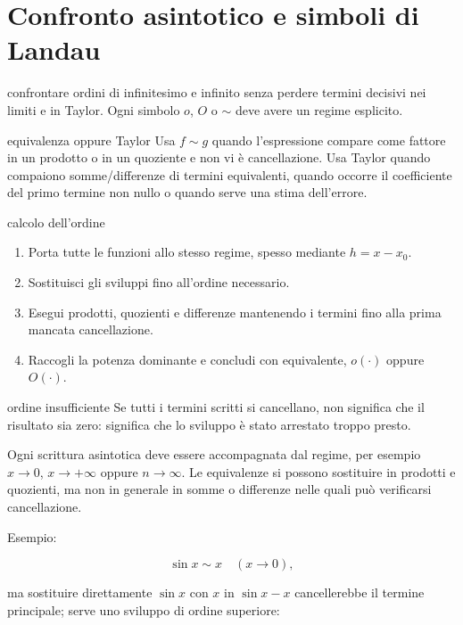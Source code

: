 \chapter{Confronto asintotico e simboli di Landau}
\label{chap:9}

\begin{obiettivocapitolo}{confrontare ordini di infinitesimo e infinito senza perdere termini decisivi}
\prioritaalta nei limiti e in Taylor. Ogni simbolo $o$, $O$ o $\sim$ deve avere un regime esplicito.
\end{obiettivocapitolo}
\begin{sceltametodo}{equivalenza oppure Taylor}
Usa $f\sim g$ quando l'espressione compare come fattore in un prodotto o in un quoziente e non vi è cancellazione. Usa Taylor quando compaiono somme/differenze di termini equivalenti, quando occorre il coefficiente del primo termine non nullo o quando serve una stima dell'errore.
\end{sceltametodo}
\begin{proceduraesame}{calcolo dell'ordine}
\begin{enumerate}
\item Porta tutte le funzioni allo stesso regime, spesso mediante $h=x-x_0$.
\item Sostituisci gli sviluppi fino all'ordine necessario.
\item Esegui prodotti, quozienti e differenze mantenendo i termini fino alla prima mancata cancellazione.
\item Raccogli la potenza dominante e concludi con equivalente, $o(\cdot)$ oppure $O(\cdot)$.
\end{enumerate}
\end{proceduraesame}
\begin{errorefrequente}{ordine insufficiente}
Se tutti i termini scritti si cancellano, non significa che il risultato sia zero: significa che lo sviluppo è stato arrestato troppo presto.
\end{errorefrequente}

Ogni scrittura asintotica deve essere accompagnata dal regime, per esempio \(x\to0\), \(x\to+\infty\) oppure \(n\to\infty\). Le equivalenze si possono sostituire in prodotti e quozienti, ma non in generale in somme o differenze nelle quali può verificarsi cancellazione.

Esempio:

\[
\sin x\sim x\quad(x\to0),
\]

ma sostituire direttamente \(\sin x\) con \(x\) in \(\sin x-x\) cancellerebbe il termine principale; serve uno sviluppo di ordine superiore:

